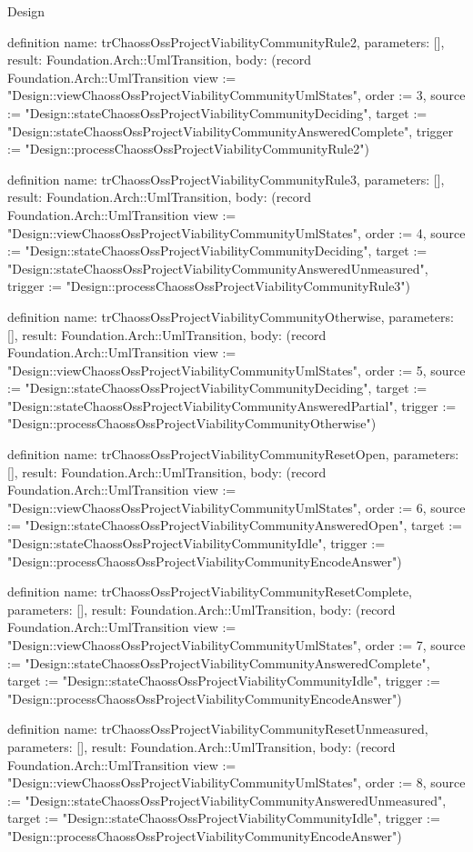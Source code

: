 \begin{lexlean}{Design}
\begin{semanticmodule}
definition{
  name: trChaossOssProjectViabilityCommunityRule2,
  parameters: [],
  result: Foundation.Arch::UmlTransition,
  body: (record Foundation.Arch::UmlTransition {view := "Design::viewChaossOssProjectViabilityCommunityUmlStates", order := 3, source := "Design::stateChaossOssProjectViabilityCommunityDeciding", target := "Design::stateChaossOssProjectViabilityCommunityAnsweredComplete", trigger := "Design::processChaossOssProjectViabilityCommunityRule2"})
}

definition{
  name: trChaossOssProjectViabilityCommunityRule3,
  parameters: [],
  result: Foundation.Arch::UmlTransition,
  body: (record Foundation.Arch::UmlTransition {view := "Design::viewChaossOssProjectViabilityCommunityUmlStates", order := 4, source := "Design::stateChaossOssProjectViabilityCommunityDeciding", target := "Design::stateChaossOssProjectViabilityCommunityAnsweredUnmeasured", trigger := "Design::processChaossOssProjectViabilityCommunityRule3"})
}

definition{
  name: trChaossOssProjectViabilityCommunityOtherwise,
  parameters: [],
  result: Foundation.Arch::UmlTransition,
  body: (record Foundation.Arch::UmlTransition {view := "Design::viewChaossOssProjectViabilityCommunityUmlStates", order := 5, source := "Design::stateChaossOssProjectViabilityCommunityDeciding", target := "Design::stateChaossOssProjectViabilityCommunityAnsweredPartial", trigger := "Design::processChaossOssProjectViabilityCommunityOtherwise"})
}

definition{
  name: trChaossOssProjectViabilityCommunityResetOpen,
  parameters: [],
  result: Foundation.Arch::UmlTransition,
  body: (record Foundation.Arch::UmlTransition {view := "Design::viewChaossOssProjectViabilityCommunityUmlStates", order := 6, source := "Design::stateChaossOssProjectViabilityCommunityAnsweredOpen", target := "Design::stateChaossOssProjectViabilityCommunityIdle", trigger := "Design::processChaossOssProjectViabilityCommunityEncodeAnswer"})
}

definition{
  name: trChaossOssProjectViabilityCommunityResetComplete,
  parameters: [],
  result: Foundation.Arch::UmlTransition,
  body: (record Foundation.Arch::UmlTransition {view := "Design::viewChaossOssProjectViabilityCommunityUmlStates", order := 7, source := "Design::stateChaossOssProjectViabilityCommunityAnsweredComplete", target := "Design::stateChaossOssProjectViabilityCommunityIdle", trigger := "Design::processChaossOssProjectViabilityCommunityEncodeAnswer"})
}

definition{
  name: trChaossOssProjectViabilityCommunityResetUnmeasured,
  parameters: [],
  result: Foundation.Arch::UmlTransition,
  body: (record Foundation.Arch::UmlTransition {view := "Design::viewChaossOssProjectViabilityCommunityUmlStates", order := 8, source := "Design::stateChaossOssProjectViabilityCommunityAnsweredUnmeasured", target := "Design::stateChaossOssProjectViabilityCommunityIdle", trigger := "Design::processChaossOssProjectViabilityCommunityEncodeAnswer"})
}


\end{semanticmodule}
\end{lexlean}
